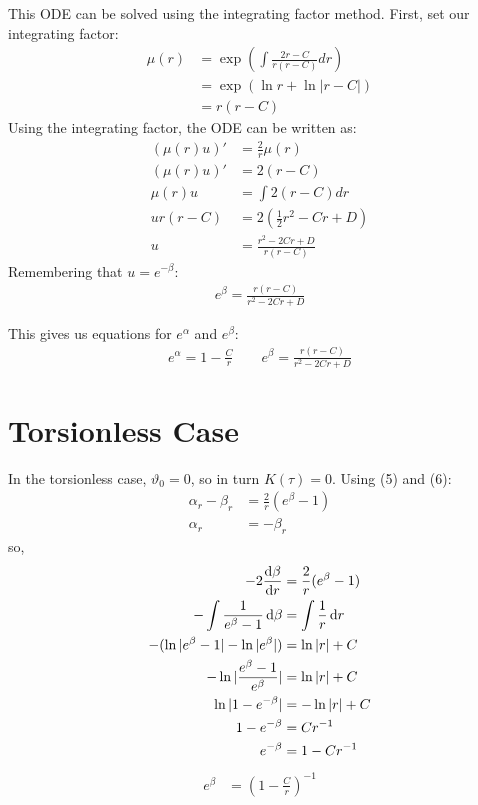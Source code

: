 \documentclass[12pt]{article}
\begin{document}
This ODE can be solved using the integrating factor method. First, set our integrating factor:
\begin{align*}
  \mu(r) &= \exp\left(\int \frac{2r-C}{r(r-C)} dr\right) \\
  &= \exp(\ln{r} + \ln|r-C|) \\
  &= r(r-C)
\end{align*}
Using the integrating factor, the ODE can be written as:
\begin{align*}
  (\mu(r)u)' &= \frac{2}{r}\mu(r) \\
  (\mu(r)u)' &= 2(r-C) \\
  \mu(r)u &= \int 2(r-C) dr \\
  ur(r-C) &= 2\left(\frac{1}{2}r^2 - Cr + D\right) \\
  u &= \frac{r^2 - 2Cr + D}{r(r-C)}
\end{align*}
Remembering that $u = e^{-\beta}$:
\begin{align}
  e^\beta = \frac{r(r-C)}{r^2 - 2Cr + D}
\end{align}

This gives us equations for $e^\alpha$ and $e^\beta$:
\begin{align*}
  e^\alpha = 1 - \frac{C}{r} \qquad e^\beta = \frac{r(r-C)}{r^2 - 2Cr + D}
\end{align*}

\section*{Torsionless Case}

In the torsionless case, $\vartheta_0 = 0$, so in turn $K(\tau) = 0$. Using (5) and (6):
\begin{align}
  \alpha_r - \beta_r &= \frac{2}{r}(e^\beta - 1) \\
  \alpha_r &= -\beta_r
\end{align}
so,
\begin{align*}
  -2\dv{\beta}{r} &= \frac{2}{r}(e^\beta - 1) \\
  -\int\frac{1}{e^\beta - 1}\dd{\beta} &= \int\frac{1}{r}\dd{r} \\
  -(\ln|e^\beta - 1| - \ln|e^\beta|) &= \ln|r| + C \\
  -\ln|\frac{e^\beta - 1}{e^\beta}| &= \ln|r| + C \\
  \ln|1-e^{-\beta}| &= -\ln|r| + C \\
  1-e^{-\beta} &= Cr^{-1} \\
  e^{-\beta} &= 1-Cr^{-1}
\end{align*}
\begin{align}
  e^\beta &= \left(1-\frac{C}{r}\right)^{-1}
\end{align}
\end{document}
